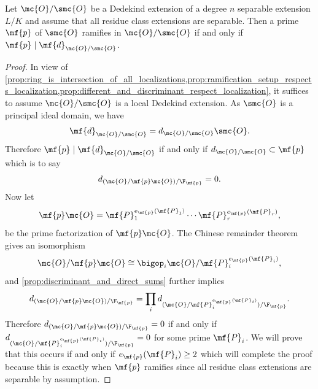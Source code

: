 \documentclass[12pt]{article}
\begin{document}
      \begin{theorem}\label{thm:ramifies_if_and_only_if_divides_the_discriminant}
        Let \(\mc{O}/\smc{O}\) be a Dedekind extension of a degree \(n\) separable extension \(L/K\) and assume that all residue class extensions are separable. Then a prime \(\mf{p}\) of \(\smc{O}\) ramifies in \(\mc{O}/\smc{O}\) if and only if \(\mf{p} \mid \mf{d}_{\mc{O}/\smc{O}}\).
      \end{theorem}
      \begin{proof}
        In view of \cref{prop:ring_is_intersection_of_all_localizations,prop:ramification_setup_respects_localization,prop:different_and_discriminant_respect_localization}, it suffices to assume \(\mc{O}/\smc{O}\) is a local Dedekind extension. As \(\smc{O}\) is a principal ideal domain, we have
        \[
          \mf{d}_{\mc{O}/\smc{O}} = d_{\mc{O}/\smc{O}}\smc{O}.
        \]
        Therefore \(\mf{p} \mid \mf{d}_{\mc{O}/\smc{O}}\) if and only if \(d_{\mc{O}/\smc{O}} \subset \mf{p}\) which is to say
        \[
          d_{(\mc{O}/\mf{p}\mc{O})/\F_{\mf{p}}} = 0.
        \]
        Now let
        \[
          \mf{p}\mc{O} = \mf{P}_{1}^{e_{\mf{p}}(\mf{P}_{1})} \cdots \mf{P}_{r}^{e_{\mf{p}}(\mf{P}_{r})},
        \]
        be the prime factorization of \(\mf{p}\mc{O}\). The Chinese remainder theorem gives an isomorphism
        \[
          \mc{O}/\mf{p}\mc{O} \cong \bigop_{i} \mc{O}/\mf{P}_{i}^{e_{\mf{p}}(\mf{P}_{i})},
        \]
        and \cref{prop:discriminant_and_direct_sums} further implies
        \[
          d_{(\mc{O}/\mf{p}\mc{O})/\F_{\mf{p}}} = \prod_{i}d_{(\mc{O}/\mf{P}_{i}^{e_{\mf{p}}(\mf{P}_{i})})/\F_{\mf{p}}}.
        \]
        Therefore \(d_{(\mc{O}/\mf{p}\mc{O})/\F_{\mf{p}}} = 0\) if and only if \(d_{(\mc{O}/\mf{P}_{i}^{e_{\mf{p}}(\mf{P}_{i})})/\F_{\mf{p}}} = 0\) for some prime \(\mf{P}_{i}\). We will prove that this occurs if and only if \(e_{\mf{p}}(\mf{P}_{i}) \ge 2\) which will complete the proof because this is exactly when \(\mf{p}\) ramifies since all residue class extensions are separable by assumption.
        

\end{proof}
\end{document}
